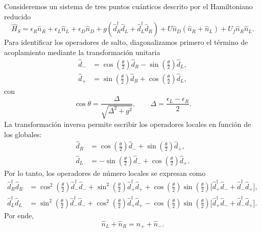 \begin{appendixs}
Consideremos un sistema de tres puntos cuánticos descrito por el Hamiltoniano reducido
\begin{equation*}
    \hat{H}_{S} = \epsilon_{R}\hat{n}_{R} + \epsilon_{L}\hat{n}_{L} + \epsilon_{D}\hat{n}_{D}
    + g(\hat{d}^{\dagger}_{R}\hat{d}_{L} + \hat{d}^{\dagger}_{L}\hat{d}_{R})
    + U \hat{n}_{D}(\hat{n}_{R} + \hat{n}_{L}) + U_{f}\hat{n}_{R}\hat{n}_{L}.
\end{equation*}
Para identificar los operadores de salto, diagonalizamos primero el término de acoplamiento mediante la transformación unitaria
\begin{align*}
    \hat{d}_{-} & = \cos(\tfrac{\theta}{2})\hat{d}_{R} - \sin(\tfrac{\theta}{2})\hat{d}_{L}, \\
    \hat{d}_{+} & = \sin(\tfrac{\theta}{2})\hat{d}_{R} + \cos(\tfrac{\theta}{2})\hat{d}_{L},
\end{align*}
con
\begin{equation*}
    \cos \theta = \frac{\Delta}{\sqrt{ \Delta^{2} + g^{2} }}, 
    \qquad 
    \Delta = \frac{\epsilon_{L}-\epsilon_{R}}{2}.
\end{equation*}
La transformación inversa permite escribir los operadores locales en función de los globales:
\begin{align*}
    \hat{d}_{R} & = \cos(\tfrac{\theta}{2})\hat{d}_{-} + \sin(\tfrac{\theta}{2})\hat{d}_{+}, \\
    \hat{d}_{L} & = -\sin(\tfrac{\theta}{2})\hat{d}_{-} + \cos(\tfrac{\theta}{2})\hat{d}_{+}.
\end{align*}
Por lo tanto, los operadores de número locales se expresan como
\begin{align*}
    \hat{d}^{\dagger}_{R}\hat{d}_{R} & =
    \cos^{2}(\tfrac{\theta}{2}) \hat{d}^{\dagger}_{-}\hat{d}_{-} + \sin^{2}(\tfrac{\theta}{2}) \hat{d}^{\dagger}_{+}\hat{d}_{+}
    + \cos(\tfrac{\theta}{2})\sin(\tfrac{\theta}{2})\big[\hat{d}^{\dagger}_{+}\hat{d}_{-} + \hat{d}^{\dagger}_{-}\hat{d}_{+} \big], \\
    \hat{d}^{\dagger}_{L}\hat{d}_{L} & =
    \sin^{2}(\tfrac{\theta}{2}) \hat{d}^{\dagger}_{-}\hat{d}_{-} + \cos^{2}(\tfrac{\theta}{2}) \hat{d}^{\dagger}_{+}\hat{d}_{+}
    - \cos(\tfrac{\theta}{2})\sin(\tfrac{\theta}{2})\big[\hat{d}^{\dagger}_{+}\hat{d}_{-} + \hat{d}^{\dagger}_{-}\hat{d}_{+} \big].
\end{align*}
Por ende,
\begin{equation}
    \hat{n}_{L} + \hat{n}_{R} = \hat{n}_{+} + \hat{n}_{-}.
    \label{apendixnumber}
\end{equation}

\end{appendixs}
